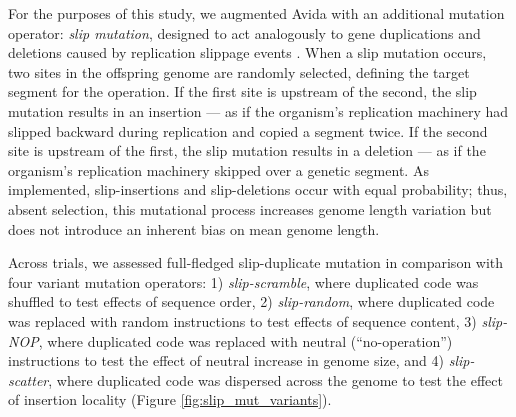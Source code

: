 For the purposes of this study, we augmented Avida with an additional mutation operator: \textit{slip mutation}, designed to act analogously to gene duplications and deletions caused by replication slippage events \citep{bzymek_instability_2001}.
When a slip mutation occurs, two sites in the offspring genome are randomly selected, defining the target segment for the operation.
If the first site is upstream of the second, the slip mutation results in an insertion --- as if the organism's replication machinery had slipped backward during replication and copied a segment twice.
If the second site is upstream of the first, the slip mutation results in a deletion --- as if the organism's replication machinery skipped over a genetic segment.
As implemented, slip-insertions and slip-deletions occur with equal probability; thus, absent selection, this mutational process increases genome length variation but does not introduce an inherent bias on mean genome length.

Across trials, we assessed full-fledged slip-duplicate mutation in comparison with four variant mutation operators:
1) \textit{slip-scramble}, where duplicated code was shuffled to test effects of sequence order,
2) \textit{slip-random}, where duplicated code was replaced with random instructions to test effects of sequence content,
3) \textit{slip-NOP}, where duplicated code was replaced with neutral (``no-operation'') instructions to test the effect of neutral increase in genome size, and
4) \textit{slip-scatter}, where duplicated code was dispersed across the genome to test the effect of insertion locality (Figure \ref{fig:slip_mut_variants}).

